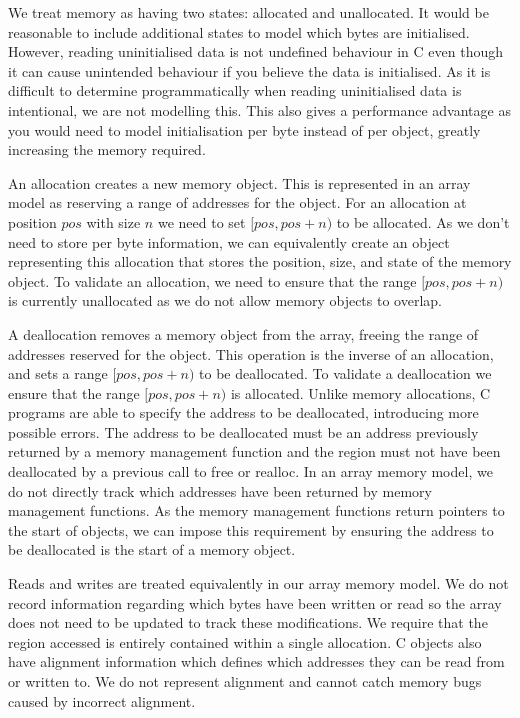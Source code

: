 \documentclass[12pt,twoside]{report}
\begin{document}
We treat memory as having two states: allocated and unallocated. It would be reasonable to include additional states to model which bytes are initialised. However, reading uninitialised data is not undefined behaviour in C even though it can cause unintended behaviour if you believe the data is initialised. As it is difficult to determine programmatically when reading uninitialised data is intentional, we are not modelling this. This also gives a performance advantage as you would need to model initialisation per byte instead of per object, greatly increasing the memory required.

An allocation creates a new memory object. This is represented in an array model as reserving a range of addresses for the object. For an allocation at position $pos$ with size $n$ we need to set $[pos, pos + n)$ to be allocated. As we don't need to store per byte information, we can equivalently create an object representing this allocation that stores the position, size, and state of the memory object. To validate an allocation, we need to ensure that the range $[pos, pos + n)$ is currently unallocated as we do not allow memory objects to overlap.

A deallocation removes a memory object from the array, freeing the range of addresses reserved for the object. This operation is the inverse of an allocation, and sets a range $[pos, pos + n)$ to be deallocated. To validate a deallocation we ensure that the range $[pos, pos + n)$ is allocated. Unlike memory allocations, C programs are able to specify the address to be deallocated, introducing more possible errors. The address to be deallocated must be an address previously returned by a memory management function and the region must not have been deallocated by a previous call to free or realloc. In an array memory model, we do not directly track which addresses have been returned by memory management functions. As the memory management functions return pointers to the start of objects, we can impose this requirement by ensuring the address to be deallocated is the start of a memory object.

Reads and writes are treated equivalently in our array memory model. We do not record information regarding which bytes have been written or read so the array does not need to be updated to track these modifications. We require that the region accessed is entirely contained within a single allocation. C objects also have alignment information which defines which addresses they can be read from or written to. We do not represent alignment and cannot catch memory bugs caused by incorrect alignment.
\end{document}
